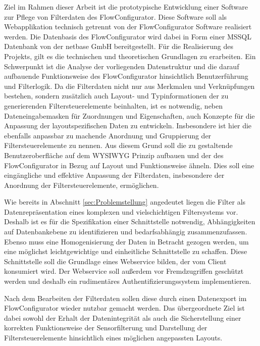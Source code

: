 Ziel im Rahmen dieser Arbeit ist die prototypische Entwicklung einer Software zur Pflege von Filterdaten des FlowConfigurator. Diese Software soll als Webapplikation technisch getrennt von der FlowConfigurator Software realisiert werden. Die Datenbasis des FlowConfigurator wird dabei in Form einer \ac{MSSQL} Datenbank von der netbase GmbH bereitgestellt. Für die Realisierung des Projekts, gilt es die technischen und theoretischen Grundlagen zu erarbeiten. Ein Schwerpunkt ist die Analyse der vorliegenden Datenstruktur und die darauf aufbauende Funktionsweise des FlowConfigurator hinsichtlich Benutzerführung und Filterlogik. Da die Filterdaten nicht nur aus Merkmalen und Verknüpfungen bestehen, sondern zusätzlich auch Layout- und Typinformationen der zu generierenden Filtersteuerelemente beinhalten, ist es notwendig, neben Dateneingabemasken für Zuordnungen und Eigenschaften, auch Konzepte für die Anpassung der layoutspezifischen Daten zu entwickeln. Insbesondere ist hier die ebenfalls anpassbar zu machende Anordnung und Gruppierung der Filtersteuerelemente zu nennen. Aus diesem Grund soll die zu gestaltende Benutzeroberfläche auf dem \ac{WYSIWYG} Prinzip aufbauen und der des FlowConfigurator in Bezug auf Layout und Funktionsweise ähneln. Dies soll eine eingängliche und effektive Anpassung der Filterdaten, insbesondere der Anordnung der Filtersteuerelemente, ermöglichen. 

Wie bereits in Abschnitt \ref{sec:Problemstellung} angedeutet liegen die Filter als Datenrepräsentation eines komplexen und vielschichtigen Filtersystems vor. Deshalb ist es für die Spezifikation einer Schnittstelle notwendig, Abhängigkeiten auf Datenbankebene zu identifizieren und bedarfsabhängig zusammenzufassen.  Ebenso muss eine Homogenisierung der Daten in Betracht gezogen werden, um eine möglichst leichtgewichtige und einheitliche Schnittstelle zu schaffen. Diese Schnittstelle soll die Grundlage eines Webservice bilden, der vom Client konsumiert wird. Der Webservice soll außerdem vor Fremdzugriffen geschützt werden und deshalb ein rudimentäres Authentifizierungssystem implementieren.

Nach dem Bearbeiten der Filterdaten sollen diese durch einen Datenexport im FlowConfigurator wieder nutzbar gemacht werden. Das übergeordnete Ziel ist dabei sowohl der Erhalt der Datenintegrität als auch die Sicherstellung einer korrekten Funktionsweise der Sensorfilterung und Darstellung der Filtersteuerelemente hinsichtlich eines möglichen angepassten Layouts.

\newpage

